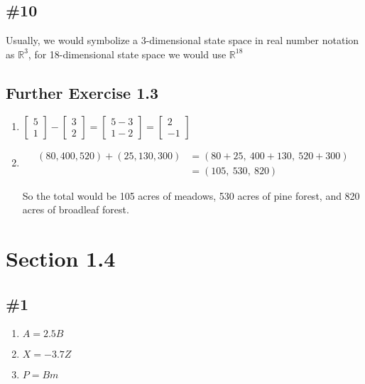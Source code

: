 \documentclass[12pt]{article}
\begin{document}
\subsection*{\#10}
Usually, we would symbolize a 3-dimensional state space in real number notation as $\mathbb{R}^3$, for 18-dimensional state space we would use $\mathbb{R}^{18}$

\subsection*{Further Exercise 1.3}
\begin{enumerate}
    \item $\begin{bmatrix} 5 \\ 1 \end{bmatrix} - \begin{bmatrix} 3 \\ 2 \end{bmatrix} = \begin{bmatrix} 5 - 3 \\ 1 - 2 \end{bmatrix} = \begin{bmatrix} 2 \\ -1 \end{bmatrix}$
    \item \[
    \begin{aligned}
    (80, 400, 520) + (25, 130, 300)
    &= (80 + 25,\ 400 + 130,\ 520 + 300) \\
    &= (105,\ 530,\ 820)
    \end{aligned}
    \] 
    
    So the total would be 105 acres of meadows, 530 acres of pine forest, and 820 acres of broadleaf forest.
\end{enumerate}

\section*{Section 1.4}
\subsection*{\#1}
\begin{enumerate}[label=\alph*.]
    \item $A = 2.5B$
    \item $X = -3.7Z$
    \item $P = Bm$
\end{enumerate}
\end{document}
